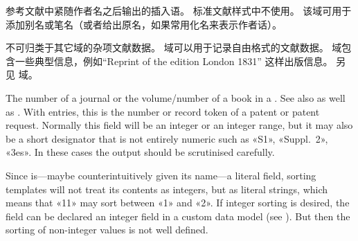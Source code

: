 \begin{fieldlist}



参考文献中紧随作者名之后输出的插入语。
标准文献样式中不使用。
该域可用于添加别名或笔名（或者给出原名，如果常用化名来表示作者话）。




不可归类于其它域的杂项文献数据。
 域可以用于记录自由格式的文献数据。
 域包含一些典型信息，例如“Reprint of the edition London 1831” 这样出版信息。
另见  域。



The number of a journal or the volume\slash number of a book in a . See also  as well as . With  entries, this is the number or record token of a patent or patent request. Normally this field will be an integer or an integer range, but it may also be a short designator that is not entirely numeric such as «S1», «Suppl.\ 2», «3es». In these cases the output should be scrutinised carefully.

Since  is---maybe counterintuitively given its name---a literal field, sorting templates will not treat its contents as integers, but as literal strings, which means that «11» may sort between «1» and «2». If integer sorting is desired, the field can be declared an integer field in a custom data model (see ). But then the sorting of non-integer values is not well defined.


\end{fieldlist}
